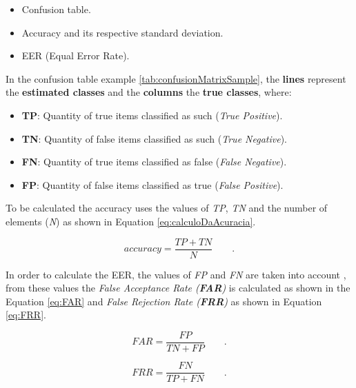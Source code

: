 		\begin{itemize}
			\item Confusion table.
			\item Accuracy and its respective standard deviation.
			\item EER (Equal Error Rate).
		\end{itemize}
	
		\par In the confusion table example \ref{tab:confusionMatrixSample}, the \textbf{lines} represent the \textbf{estimated classes} and the \textbf{columns} the \textbf{true classes}, where:

		\begin{itemize}
			\item \textbf{TP}: Quantity of true items classified as such (\textit{True Positive}).
			\item \textbf{TN}: Quantity of false items classified as such (\textit{True Negative}).
			\item \textbf{FN}: Quantity of true items classified as false (\textit{False Negative}).
			\item \textbf{FP}: Quantity of false items classified as true (\textit{False Positive}).
		\end{itemize}

		

		\par To be calculated the accuracy uses the values of \textit{TP}, \textit{TN} and the number of elements (\textit{N}) as shown in Equation \ref{eq:calculoDaAcuracia}.
		
		\begin{equation}
			accuracy = \dfrac{TP + TN}{N} \qquad.
			\label{eq:calculoDaAcuracia}
		\end{equation}

		\par In order to calculate the EER, the values of \textit{FP} and \textit{FN}  are taken into account \cite{ghazali2018recent}, from these values the \textit{False Acceptance Rate (\textbf{FAR})} is calculated as shown in the Equation \ref{eq:FAR} and \textit{False Rejection Rate (\textbf{FRR})} as shown in Equation \ref{eq:FRR}.

		\begin{equation}
			FAR=\dfrac{FP}{TN+FP} \qquad.
			\label{eq:FAR}
		\end{equation}
		
		\begin{equation}
			FRR=\dfrac{FN}{TP+FN} \qquad.
			\label{eq:FRR}
		\end{equation}

